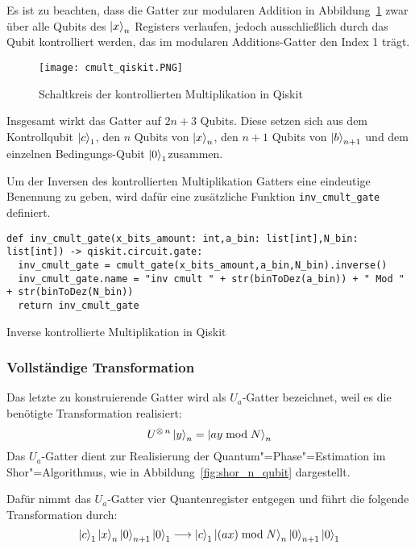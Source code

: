 Es ist zu beachten, dass die Gatter zur modularen Addition in Abbildung~\ref{fig:cmult_qiskit} zwar über 
alle Qubits des \(\ket{x}_n\) Registers verlaufen, 
jedoch ausschließlich durch das Qubit kontrolliert werden, 
das im modularen Additions-Gatter den Index 1 trägt.

\begin{figure} [H]
  \centering
  \texttt{[image: cmult\_qiskit.PNG]}
  \caption{Schaltkreis der kontrollierten Multiplikation in Qiskit}
  \label{fig:cmult_qiskit}
\end{figure}

Insgesamt wirkt das Gatter auf \(2n+3\) Qubits.
Diese setzen sich aus dem Kontrollqubit \(\ket{c}_1\), den \(n\) Qubits von \(\ket{x}_n\), 
den \(n+1\) Qubits von \(\ket{b}_{n+1}\) und dem einzelnen Bedingungs-Qubit \(\ket{0}_1\)zusammen.

Um der Inversen des kontrollierten Multiplikation Gatters eine eindeutige Benennung zu geben, 
wird dafür eine zusätzliche Funktion \texttt{inv\_cmult\_gate} definiert.
\begin{listing}[H]
\begin{verbatim}  
def inv_cmult_gate(x_bits_amount: int,a_bin: list[int],N_bin: list[int]) -> qiskit.circuit.gate:  
  inv_cmult_gate = cmult_gate(x_bits_amount,a_bin,N_bin).inverse()
  inv_cmult_gate.name = "inv cmult " + str(binToDez(a_bin)) + " Mod " + str(binToDez(N_bin))
  return inv_cmult_gate
  \end{verbatim}
  \caption{Inverse kontrollierte Multiplikation in Qiskit}
  \label{code:InverseModularMultiplication}
\end{listing}

\subsubsection{Vollständige Transformation}

Das letzte zu konstruierende Gatter wird als \(U_a\)-Gatter bezeichnet, 
weil es die benötigte Transformation realisiert: 
\[U^{\operatorname{\otimes} n}\ket{y}_n = \ket{ay \bmod N}_n\] 
Das \(U_a\)-Gatter dient zur Realisierung der Quantum"=Phase"=Estimation im Shor"=Algorithmus, 
wie in Abbildung~\ref{fig:shor_n_qubit} dargestellt.

Dafür nimmt das \(U_a\)-Gatter vier Quantenregister entgegen und 
führt die folgende Transformation durch: 
\[\ket{c}_1\ket{x}_{n}\ket{0}_{n+1}\ket{0}_1
\longrightarrow
\ket{c}_1\ket{(a x) \bmod N}_{n}\ket{0}_{n+1}\ket{0}_1
\]

